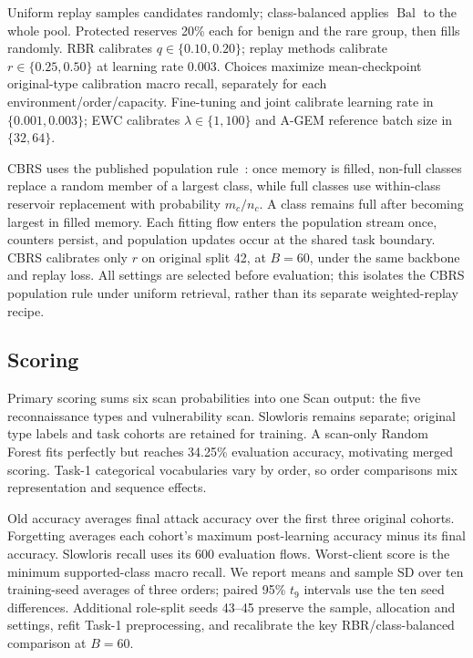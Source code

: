 \documentclass[journal,10pt]{IEEEtran}
\begin{document}
Uniform replay samples candidates randomly; class-balanced applies $\operatorname{Bal}$ to the whole pool. Protected reserves 20\% each for benign and the rare group, then fills randomly. RBR calibrates $q\in\{0.10,0.20\}$; replay methods calibrate $r\in\{0.25,0.50\}$ at learning rate 0.003. Choices maximize mean-checkpoint original-type calibration macro recall, separately for each environment/order/capacity. Fine-tuning and joint calibrate learning rate in $\{0.001,0.003\}$; EWC calibrates $\lambda\in\{1,100\}$ and A-GEM reference batch size in $\{32,64\}$.

CBRS uses the published population rule~\cite{cbrs}: once memory is filled, non-full classes replace a random member of a largest class, while full classes use within-class reservoir replacement with probability $m_c/n_c$. A class remains full after becoming largest in filled memory. Each fitting flow enters the population stream once, counters persist, and population updates occur at the shared task boundary. CBRS calibrates only $r$ on original split 42, at $B=60$, under the same backbone and replay loss. All settings are selected before evaluation; this isolates the CBRS population rule under uniform retrieval, rather than its separate weighted-replay recipe.

\subsection{Scoring}
Primary scoring sums six scan probabilities into one Scan output: the five reconnaissance types and vulnerability scan. Slowloris remains separate; original type labels and task cohorts are retained for training. A scan-only Random Forest fits perfectly but reaches 34.25\% evaluation accuracy, motivating merged scoring. Task-1 categorical vocabularies vary by order, so order comparisons mix representation and sequence effects.

Old accuracy averages final attack accuracy over the first three original cohorts. Forgetting averages each cohort's maximum post-learning accuracy minus its final accuracy. Slowloris recall uses its 600 evaluation flows. Worst-client score is the minimum supported-class macro recall. We report means and sample SD over ten training-seed averages of three orders; paired 95\% $t_9$ intervals use the ten seed differences. Additional role-split seeds 43--45 preserve the sample, allocation and settings, refit Task-1 preprocessing, and recalibrate the key RBR/class-balanced comparison at $B=60$.
\end{document}
